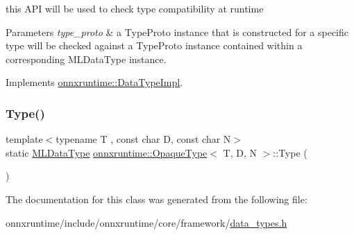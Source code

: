 this A\+PI will be used to check type compatibility at runtime 


\begin{DoxyParams}{Parameters}
{\em type\+\_\+proto} & a Type\+Proto instance that is constructed for a specific type will be checked against a Type\+Proto instance contained within a corresponding M\+L\+Data\+Type instance. \\
\hline
\end{DoxyParams}


Implements \mbox{\hyperlink{classonnxruntime_1_1DataTypeImpl_a94b2c274bd74068291356c81515d69a1}{onnxruntime\+::\+Data\+Type\+Impl}}.

\mbox{\label{classonnxruntime_1_1OpaqueType_aa3c7c495b0e75472262f7ee2e4b72018}} 
\subsubsection{\texorpdfstring{Type()}{Type()}}
{\footnotesize\ttfamily template$<$typename T , const char D, const char N$>$ \\
static \mbox{\hyperlink{namespaceonnxruntime_ad77d0a6e838ec7da5dc35fed5ee66b49}{M\+L\+Data\+Type}} \mbox{\hyperlink{classonnxruntime_1_1OpaqueType}{onnxruntime\+::\+Opaque\+Type}}$<$ T, D, N $>$\+::Type (\begin{DoxyParamCaption}{ }\end{DoxyParamCaption})\hspace{0.3cm}{\ttfamily [static]}}



The documentation for this class was generated from the following file\+:\begin{DoxyCompactItemize}
\item 
onnxruntime/include/onnxruntime/core/framework/\mbox{\hyperlink{data__types_8h}{data\+\_\+types.\+h}}\end{DoxyCompactItemize}
